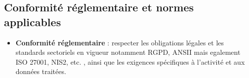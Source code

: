 \subsection*{Conformité réglementaire et normes applicables}

\begin{itemize}
	\item \textbf{Conformité réglementaire} : respecter les obligations légales et les standards sectoriels en vigueur notamment RGPD, ANSII mais egalement ISO 27001, NIS2, etc. , ainsi que les exigences spécifiques à l'activité et aux données traitées.
\end{itemize}






